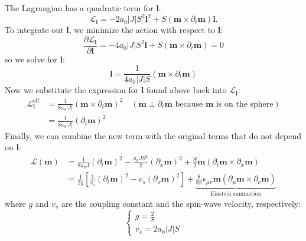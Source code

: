 The Lagrangian has a quadratic term for $\bm{l}$:
\begin{equation}
\mathcal{L}_{\bm{l}} = -2 a_0 |J| S^2 \bm{l}^2 + S (\bm{m} \times \partial_t \bm{m}) \bm{l}.
\end{equation}
To integrate out $\bm{l}$, we minimize the action with respect to $\bm{l}$:
\begin{equation}
\frac{\partial \mathcal{L}_{\bm{l}}}{\partial \bm{l}} = -4 a_0 |J| S^2 \bm{l} + S (\bm{m} \times \partial_t \bm{m}) = 0
\end{equation}
so we solve for $\bm{l}$:
\begin{equation}
\bm{l} = \frac{1}{4 a_0 |J| S} (\bm{m} \times \partial_t \bm{m})
\end{equation}
Now we substitute the expression for $\bm{l}$ found above back into $\mathcal{L}_{\bm{l}}$:
\begin{equation}
\begin{aligned}
\mathcal{L}_{\bm{l}}^{\text{eff}} &= \frac{1}{8 a_0 |J|} (\bm{m} \times \partial_t \bm{m})^2 \quad (\bm{m} \perp \partial_t \bm{m} \text{ because } \bm{m} \text{ is on the sphere}) \\
&= \frac{1}{8 a_0 |J|} (\partial_t \bm{m})^2
\end{aligned}
\end{equation}
Finally, we can combine the new term with the original terms that do not depend on $\bm{l}$:
\begin{equation}
    \label{eq:lagrangian_density}
    \begin{aligned}
    \mathcal{L}(\bm{m}) &= \frac{1}{8 a_0 J} (\partial_t \bm{m})^2 - \frac{a_0 J S^2}{2} (\partial_x \bm{m})^2 + \frac{S}{2} \bm{m} (\partial_t \bm{m} \times \partial_x \bm{m}) \\
    &= \frac{1}{2g} \left[ \frac{1}{v_s} (\partial_t \bm{m})^2 - v_s (\partial_x \bm{m})^2 \right] + \underbrace{\frac{\theta}{8\pi} \epsilon_{\mu\nu} \bm{m} (\partial_\mu \bm{m} \times \partial_\nu \bm{m})}_{\text{Einstein summation}}
    \end{aligned}
    \end{equation}
where $g$ and $v_s$ are the coupling constant and the spin-wave velocity, respectively:
\begin{equation}
\begin{cases}
g = \frac{2}{S} \\
v_s = 2 a_0 |J| S
\end{cases}
\end{equation}

